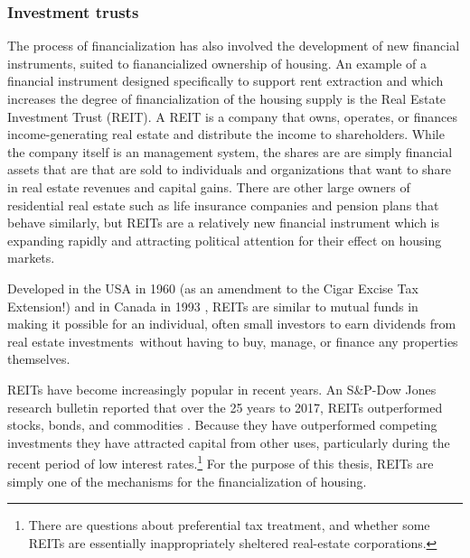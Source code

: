 
\subsubsection{Investment trusts}
The process of financialization has also involved the development of new financial instruments, suited to fianancialized ownership of housing. An example of a financial instrument designed specifically to support rent extraction and which increases the degree of financialization of the housing supply is the Real Estate Investment Trust (\gls{REIT}). A REIT is a company that owns, operates, or finances income-generating real estate and distribute the income to shareholders. While the company itself is an management system, the shares are are simply financial assets that are that are sold to individuals and organizations that want to share in real estate revenues and capital gains. There are other large owners of residential real estate such as life insurance companies and pension plans that behave similarly, but REITs are a relatively new financial instrument which is  expanding rapidly and attracting political attention for their effect on housing markets.  %

Developed in the USA  in 1960 (as an amendment to the Cigar Excise Tax Extension!) and in Canada in 1993 \cite{GET_REITsDevelopedDates}, REITs are similar to mutual funds in making it possible for an individual, often small investors to earn dividends from real estate investments without having to buy, manage, or finance any properties themselves. 

REITs have become increasingly popular in recent years. An S\&P-Dow Jones research bulletin reported that over the  25 years to 2017, REITs outperformed stocks, bonds, and commodities \cite{GET-Dow-Jones-research-bulletin}. Because they have outperformed competing investments they have attracted  capital from other uses, particularly during the recent period of low interest rates.\footnote{There are questions about preferential tax treatment, and whether some REITs are essentially inappropriately sheltered real-estate corporations.} For the purpose of this thesis, REITs are simply one of the mechanisms for the financialization of housing.

